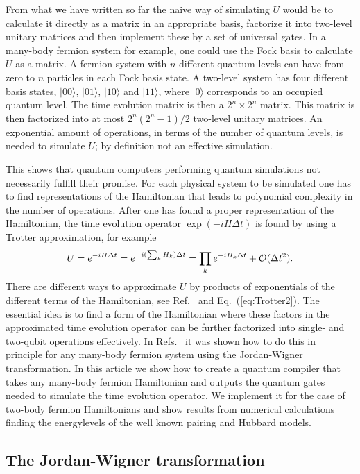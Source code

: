 \documentclass[aps,pra,twocolumn,floatfix]{revtex4}
\begin{document}
From what we have written so far
the naive way of simulating $U$ would be to calculate it directly as
a matrix in an appropriate basis, factorize it into two-level unitary
matrices and then implement these by a set of universal gates. 
In a many-body fermion system for example, one could use the Fock basis to
calculate $U$ as a matrix.  A fermion system with $n$ different
quantum levels can have from zero to $n$ particles in each Fock basis
state. A 
two-level system has four different basis states, $|00\rangle$,
$|01\rangle$, $|10\rangle$ and $|11\rangle$, where $|0\rangle$ corresponds to an
occupied quantum level.  The time evolution matrix is then a $2^n\times
2^n$ matrix.  This matrix is then factorized into at most
$2^n(2^n-1)/2$ two-level unitary matrices. An exponential
amount of operations, in terms of the number of quantum levels, is
needed to simulate $U$; by definition not an effective simulation.


This shows that quantum computers performing quantum
simulations not necessarily fulfill their promise. For each physical
system to be simulated one has to find  representations of the
Hamiltonian that leads to polynomial complexity in the number of
operations. After one has found a proper representation of the
Hamiltonian, the time evolution operator $\exp(-iH\Delta t)$ is found by using a 
Trotter approximation, for example 
\begin{equation}
\label{eq:Trotter1}
U=e^{-iH\Delta t}=e^{-i(\sum_k H_k) \Delta t} = \prod_k e^{-iH_k\Delta
  t} + {\cal O}(\Delta t^2).
\end{equation}
There are different ways to approximate $U$ by products of 
exponentials of the different terms of the Hamiltonian, see
Ref.~\cite{nielsen2000} and Eq.~(\ref{eq:Trotter2}). The essential 
idea is to find a form of the Hamiltonian where these factors in the
approximated time evolution operator can be further
factorized into single- and two-qubit operations effectively. 
In
Refs.~\cite{ortiz2001,ortiz2002}
it was shown how to do this in principle for
any many-body fermion system using the Jordan-Wigner transformation.
In this article we 
show how to create a quantum  compiler that takes
any many-body fermion Hamiltonian and outputs the quantum gates needed
to simulate the time evolution operator. We implement it for the case
of two-body fermion Hamiltonians and show results from numerical
calculations finding the energylevels of the well known pairing and
Hubbard models.


\subsection{The Jordan-Wigner transformation}
\end{document}
